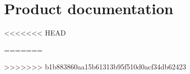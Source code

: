 \chapter{Product documentation}
<<<<<<< HEAD



\clearpage



=======
% 
% 
% 
% 
% 

>>>>>>> b1b883860aa15b61313b95f510d0acf34db62423


